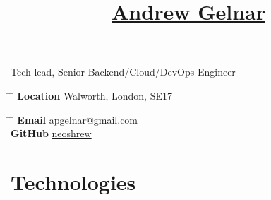 \documentclass[10pt]{article} %
\begin{document}

\title
  {\href{https://github.com/neoshrew/CV/blob/master/andrew_gelnar_cv.pdf}{Andrew Gelnar}}
  {Tech lead, Senior Backend/Cloud/DevOps Engineer}


\parbox{0.5\textwidth}{ %
  \begin{tabbing} %
    \hspace{3cm} \= \hspace{4cm} \= \kill %
    {\bf Location} \> Walworth, London, SE17
  \end{tabbing}
}
\hfill %
\parbox{0.5\textwidth}{ %
  \begin{tabbing} %
    \hspace{3cm} \= \hspace{4cm} \= \kill %
    {\bf Email} \> apgelnar@gmail.com \\ %
    {\bf GitHub} \> \href{https://github.com/neoshrew}{neoshrew}
  \end{tabbing}
}

\vspace{-5mm}
\section{Technologies}

\end{document}

